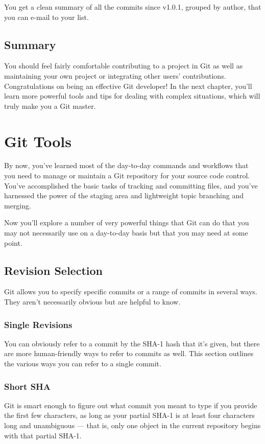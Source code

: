 \documentclass[a4paper]{book}
\newcounter{tab}[chapter]
\newcommand{\chap}[1]{\newpage\thispagestyle{empty}\chapter{#1}\label{chap:\thechapter}}
\begin{document}
You get a clean summary of all the commits since v1.0.1, grouped by author, that you can e-mail to your list.

\section{Summary}\label{summary-5}

You should feel fairly comfortable contributing to a project in Git as well as maintaining your own project or integrating other users' contributions. Congratulations on being an effective Git developer! In the next chapter, you'll learn more powerful tools and tips for dealing with complex situations, which will truly make you a Git master.

\chap{Git Tools}\label{git-tools}

By now, you've learned most of the day-to-day commands and workflows that you need to manage or maintain a Git repository for your source code control. You've accomplished the basic tasks of tracking and committing files, and you've harnessed the power of the staging area and lightweight topic branching and merging.

Now you'll explore a number of very powerful things that Git can do that you may not necessarily use on a day-to-day basis but that you may need at some point.

\section{Revision Selection}\label{revision-selection}

Git allows you to specify specific commits or a range of commits in several ways. They aren't necessarily obvious but are helpful to know.

\subsection{Single Revisions}\label{single-revisions}

You can obviously refer to a commit by the SHA-1 hash that it's given, but there are more human-friendly ways to refer to commits as well. This section outlines the various ways you can refer to a single commit.

\subsection{Short SHA}\label{short-sha}

Git is smart enough to figure out what commit you meant to type if you provide the first few characters, as long as your partial SHA-1 is at least four characters long and unambiguous --- that is, only one object in the current repository begins with that partial SHA-1.
\end{document}
